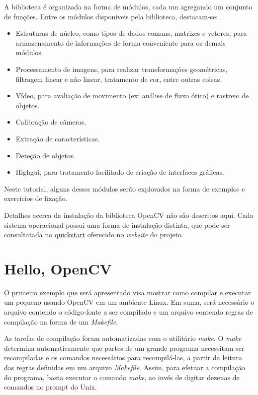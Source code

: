 \documentclass[11pt]{amsbook}
\begin{document}
A biblioteca é organizada na forma de módulos, cada um agregando um
conjunto de funções. Entre os módulos disponíveis pela biblioteca,
destacam-se:


\begin{itemize}

\item Estruturas de núcleo, como tipos de dados comuns, matrizes e vetores,
para armazenamento de informações de forma conveniente para os
demais módulos.

\item Processamento de imagens, para realizar transformações geométricas,
filtragem linear e não linear, tratamento de cor, entre outras coisas.

\item Vídeo, para avaliação de movimento (ex: análise de fluxo ótico) e
rastreio de objetos.

\item Calibração de câmeras.

\item Extração de características.

\item Deteção de objetos.

\item Highgui, para tratamento facilitado de criação de interfaces
gráficas.

\end{itemize}


Neste tutorial, alguns desses módulos serão explorados na forma de
exemplos e exercícios de fixação.


Detalhes acerca da instalação da biblioteca OpenCV não são descritos
aqui. Cada sistema operacional possui uma forma de instalação
distinta, que pode ser consultatada no
\href{http://opencv.org/quickstart.html}{quickstart} oferecido no
\emph{website} do projeto.


\hypertarget{x-hello,-opencv}{\section{Hello, OpenCV}}
O primeiro exemplo que será apresentado visa mostrar como compilar e
executar um pequeno usando OpenCV em um ambiente Linux. Em suma, será
necessário o arquivo contendo o código-fonte a ser compilado e um
arquivo contendo regras de compilação na forma de um \emph{Makefile}.


As tarefas de compilação foram automatizadas com o utilitário
\emph{make}. O \emph{make} determina automaticamente que partes de um grande
programa necessitam ser recompiladas e os comandos necessários para
recompilá-las, a partir da leitura das regras definidas em um arquivo
\emph{Makefile}. Assim, para efetuar a compilação do programa, basta
executar o comando \emph{make}, ao invés de digitar dezenas de comandos no
prompt do Unix.
\end{document}

